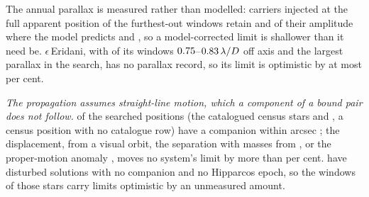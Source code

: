 The annual parallax is measured rather than modelled: carriers injected at
the full apparent position of the \SensNReextWin{} furthest-out windows
retain \SensPxSmallMeas{} and \SensPxLargeMeas{} of their amplitude where the
model predicts \SensPxSmallPred{} and \SensPxLargePred, so a model-corrected
limit is shallower than it need be. $\epsilon$\,Eridani, with \BmEpsNOff{} of its
\BmEpsNWin{} windows $0.75$--$0.83\,\lambda/D$ off axis and the
largest parallax in the search, has no parallax record, so its limit is
optimistic by at most \BmEpsPxBoundPct{} per cent.

\emph{The propagation assumes straight-line motion, which a component of a
bound pair does not follow.} \OmNComponent{} of the \OmNStar{} searched
positions (the \OmNCensusStar{} catalogued census stars and \OmXStar, a
census position with no catalogue row) have a companion
within \OmRadius{} arcsec \citep{wds,orb6}; the displacement, from a visual
orbit, the separation with masses from \citet{pecaut2013}, or the
proper-motion anomaly \citep{kervella2022}, moves no system's limit by more
than \OmSysMovedMaxPct{} per cent. \OmFlagStars{} have disturbed solutions
with no companion and no Hipparcos epoch, so the \OmNWinFlag{} windows of
those \OmNFlag{} stars carry limits optimistic by an unmeasured amount.

\begin{table}
\centering
\scriptsize
\caption{\textbf{The survey ledger, part one: execution blocks and windows.}
Each row carries its own number, and a group sums to the row whose number
heads it. Hours are window-hours, so the classes partition the hours as they
partition the windows. Rows~3.2 to 3.5 are the archival gap, over which no
result is formed.}
\label{tab:blockledger}

\end{table}

